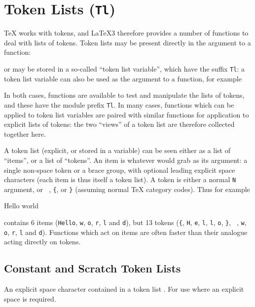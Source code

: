 \documentclass[oneside]{book}
\begin{document}
\chapter{Token Lists (\texttt{Tl})}

\TeX{} works with tokens, and \LaTeX3 therefore provides a number of
functions to deal with lists of tokens.  Token lists may be present
directly in the argument to a function:
\begin{codehigh}
\end{codehigh}
or may be stored in a so-called \enquote{token list variable}, which
have the suffix \texttt{Tl}: a token list variable can also be used as
the argument to a function, for example
\begin{codehigh}
\tlVarFoo \lSomeTl
\end{codehigh}
In both cases, functions are available to test and manipulate the lists
of tokens, and these have the module prefix \texttt{Tl}.
In many cases, functions which can be applied to token list variables
are paired with similar functions for application to explicit lists
of tokens: the two \enquote{views} of a token list are therefore collected
together here.

A token list (explicit, or stored in a variable) can be seen either
as a list of \enquote{items},
or a list of \enquote{tokens}. An item is whatever  would
grab as its argument: a single non-space token or a brace group,
with optional leading explicit space characters (each item is thus
itself a token list). A token is either a normal \texttt{N} argument,
or \verb*| |, \verb|{|, or \verb|}| (assuming normal \TeX{} category codes).
Thus for example
\begin{codehigh}
{Hello} world
\end{codehigh}
contains 6 items (\texttt{Hello}, \texttt{w}, \texttt{o}, \texttt{r},
\texttt{l} and \texttt{d}), but 13 tokens (\verb|{|, \texttt{H}, \texttt{e},
\texttt{l}, \texttt{l}, \texttt{o}, \verb|}|, \verb*| |, \texttt{w}, \texttt{o},
\texttt{r}, \texttt{l} and \texttt{d}).
Functions which act on items are often faster than their analogue acting
directly on tokens.

\section{Constant and Scratch Token Lists}

\begin{variable}{\cSpaceTl}
An explicit space character contained in a token list%
. For use where an explicit space is required.
\end{variable}
\end{document}
